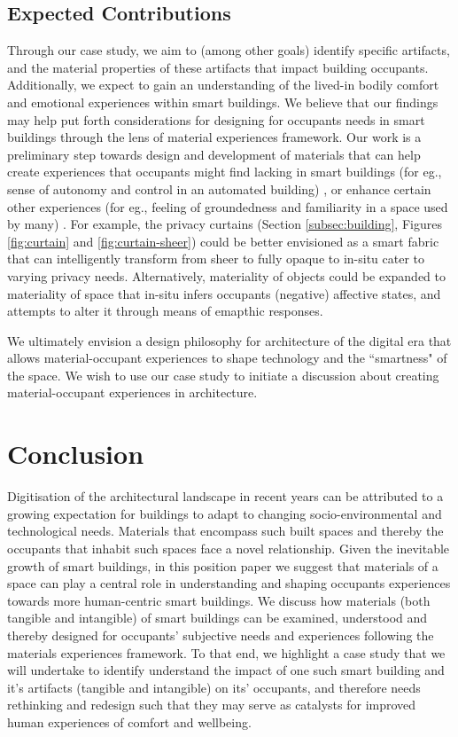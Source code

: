\documentclass[manuscript, anonymous, review]{acmart}
\begin{document}
\subsection{Expected Contributions}
Through our case study, we aim to (among other goals) identify specific artifacts, and the material properties of these artifacts that impact building occupants. Additionally, we expect to gain an understanding of the lived-in bodily comfort and emotional experiences within smart buildings. We believe that our findings may help put forth considerations for designing for occupants needs in smart buildings through the lens of material experiences framework. Our work is a preliminary step towards design and development of materials that can help create experiences that occupants might find lacking in smart buildings (for eg., sense of autonomy and control in an automated building) \cite{moreno2014user}, or enhance certain other experiences (for eg., feeling of groundedness and familiarity in a space used by many) \cite{rehman2022personalisedcomfort}.  For example, the privacy curtains (Section \ref{subsec:building}, Figures \ref{fig:curtain} and \ref{fig:curtain-sheer}) could be better envisioned as a smart fabric that can intelligently transform from sheer to fully opaque to in-situ cater to varying privacy needs. Alternatively, materiality of objects could be expanded to materiality of space that in-situ infers occupants (negative) affective states, and attempts to alter it through means of emapthic responses. 

We ultimately envision a design philosophy for architecture of the digital era that allows material-occupant experiences to shape technology and the ``smartness" of the space. We wish to use our case study to initiate a discussion about creating material-occupant experiences in architecture.


\section{Conclusion}
Digitisation of the architectural landscape in recent years can be attributed to a growing expectation for buildings to adapt to changing socio-environmental and technological needs. Materials that encompass such built spaces and thereby the occupants that inhabit such spaces face a novel relationship. Given the inevitable growth of smart buildings, in this position paper we suggest that materials of a space can play a central role in understanding and shaping occupants experiences towards more human-centric smart buildings. We discuss how materials (both tangible and intangible) of smart buildings can be examined, understood and thereby designed for occupants' subjective needs and experiences following the materials experiences framework. To that end, we highlight a case study that we will undertake to identify understand the impact of one such smart building and it's artifacts (tangible and intangible) on its'  occupants, and therefore needs rethinking and redesign such that they may serve as catalysts for improved human experiences of comfort and wellbeing. 




\end{document}
